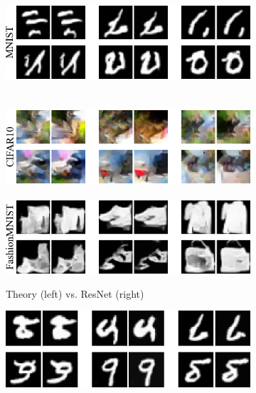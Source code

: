 \documentclass{article}
\theoremstyle{plain}
\theoremstyle{definition}
\theoremstyle{remark}
\begin{document}
\begin{figure}[t]
    \centering
    \begin{subfigure}[t]{0.35\textwidth}
    \includegraphics[width=\linewidth,valign=t]{mnist_zeros_samps_resnet_small.png} \\\\\\
    \includegraphics[width=\linewidth]{cifar10_zeros_samps_resnet_small.png}\\\\
    \includegraphics[width=\linewidth]{fashion_mnist_zeros_samps_resnet_small.png}
    \caption{Theory (left) vs. ResNet (right)}
    \end{subfigure}%
        \hspace{6mm}
    \begin{subfigure}[t]{0.335\textwidth}    
    \includegraphics[width=\linewidth,valign=t]{mnist_zeros_samps_unet_small.png}\\\\\\

\end{subfigure}
\end{figure}
\end{document}
